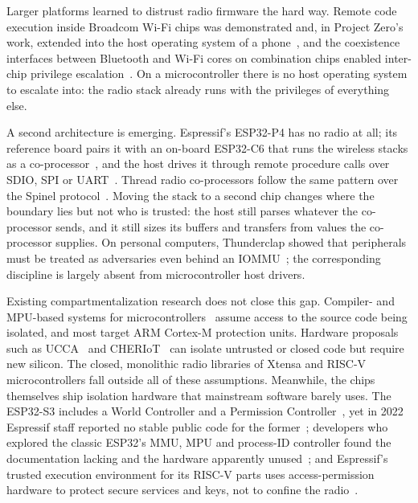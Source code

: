 \documentclass[conference,10pt]{IEEEtran}
\begin{document}
Larger platforms learned to distrust radio firmware the hard way. Remote code execution inside Broadcom Wi-Fi chips was demonstrated and, in Project Zero's work, extended into the host operating system of a phone~\cite{artenstein2017broadpwn,beniamini2017overtheair}, and the coexistence interfaces between Bluetooth and Wi-Fi cores on combination chips enabled inter-chip privilege escalation~\cite{classen2022spectra}. On a microcontroller there is no host operating system to escalate into: the radio stack already runs with the privileges of everything else.

A second architecture is emerging. Espressif's ESP32-P4 has no radio at all; its reference board pairs it with an on-board ESP32-C6 that runs the wireless stacks as a co-processor~\cite{esphostedsdio}, and the host drives it through remote procedure calls over SDIO, SPI or UART~\cite{esphostedmcu}. Thread radio co-processors follow the same pattern over the Spinel protocol~\cite{openthreadcp}. Moving the stack to a second chip changes where the boundary lies but not who is trusted: the host still parses whatever the co-processor sends, and it still sizes its buffers and transfers from values the co-processor supplies. On personal computers, Thunderclap showed that peripherals must be treated as adversaries even behind an IOMMU~\cite{markettos2019thunderclap}; the corresponding discipline is largely absent from microcontroller host drivers.

Existing compartmentalization research does not close this gap. Compiler- and MPU-based systems for microcontrollers~\cite{clements2018aces,kim2018minion,khan2023ec,zhou2022opec,du2022kage,levy2017tock} assume access to the source code being isolated, and most target ARM Cortex-M protection units. Hardware proposals such as UCCA~\cite{tyler2024ucca} and CHERIoT~\cite{amar2023cheriot,amar2025cheriotrtos} can isolate untrusted or closed code but require new silicon. The closed, monolithic radio libraries of Xtensa and RISC-V microcontrollers fall outside all of these assumptions. Meanwhile, the chips themselves ship isolation hardware that mainstream software barely uses. The ESP32-S3 includes a World Controller and a Permission Controller~\cite{esp32s3datasheet}, yet in 2022 Espressif staff reported no stable public code for the former~\cite{espforum2022wcl}; developers who explored the classic ESP32's MMU, MPU and process-ID controller found the documentation lacking and the hardware apparently unused~\cite{espforummmu}; and Espressif's trusted execution environment for its RISC-V parts uses access-permission hardware to protect secure services and keys, not to confine the radio~\cite{esptee}.
\end{document}
